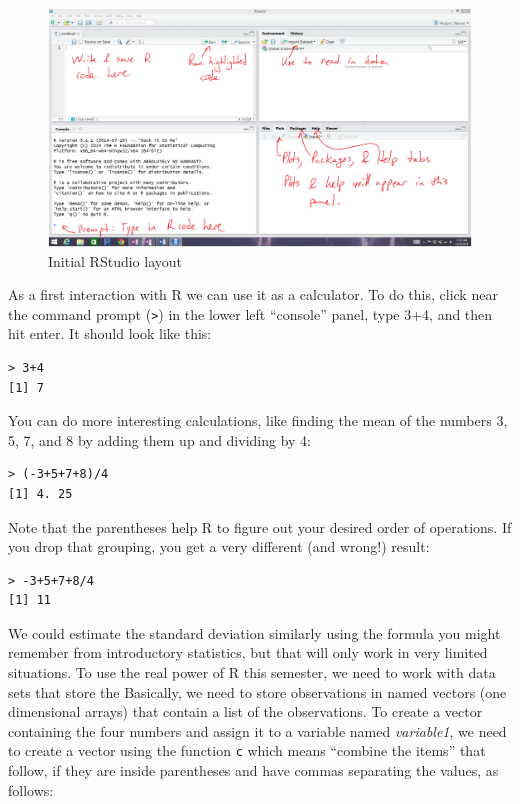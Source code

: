 \documentclass[]{article}
\begin{document}
\begin{figure}
\includegraphics[width=14.72in]{chapter0_files/image003} \caption{Initial RStudio layout}\label{fig:Figure2}
\end{figure}

As a first interaction with R we can use it as a calculator. To do this,
click near the command prompt (\texttt{\textgreater{}}) in the lower
left ``console'' panel, type 3+4, and then hit enter. It should look
like this:

\begin{verbatim}
> 3+4
[1] 7
\end{verbatim}

You can do more interesting calculations, like finding the mean of the
numbers 3, 5, 7, and 8 by adding them up and dividing by 4:

\begin{verbatim}
> (-3+5+7+8)/4
[1] 4. 25
\end{verbatim}

Note that the parentheses help R to figure out your desired order of
operations. If you drop that grouping, you get a very different (and
wrong!) result:

\begin{verbatim}
> -3+5+7+8/4
[1] 11
\end{verbatim}

We could estimate the standard deviation similarly using the formula you
might remember from introductory statistics, but that will only work in
very limited situations. To use the real power of R this semester, we
need to work with data sets that store the Basically, we need to store
observations in named vectors (one dimensional arrays) that contain a
list of the observations. To create a vector containing the four numbers
and assign it to a variable named \emph{variable1}, we need to create a
vector using the function \texttt{c} which means ``combine the items''
that follow, if they are inside parentheses and have commas separating
the values, as follows:
\end{document}
